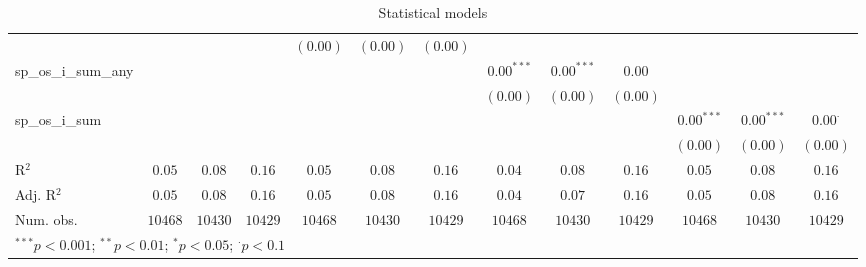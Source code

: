 \begin{sidewaystable}
\begin{center}
{\begin{tabular}{l c c c c c c c c c c c c}
                    &               &               &                 & $(0.00)$      & $(0.00)$      & $(0.00)$        &               &               &                 &                &               &                 \\
sp\_os\_i\_sum\_any &               &               &                 &               &               &                 & $0.00^{***}$  & $0.00^{***}$  & $0.00$          &                &               &                 \\
                    &               &               &                 &               &               &                 & $(0.00)$      & $(0.00)$      & $(0.00)$        &                &               &                 \\
sp\_os\_i\_sum      &               &               &                 &               &               &                 &               &               &                 & $0.00^{***}$   & $0.00^{***}$  & $0.00^{\cdot}$  \\
                    &               &               &                 &               &               &                 &               &               &                 & $(0.00)$       & $(0.00)$      & $(0.00)$        \\
\hline
R$^2$               & $0.05$        & $0.08$        & $0.16$          & $0.05$        & $0.08$        & $0.16$          & $0.04$        & $0.08$        & $0.16$          & $0.05$         & $0.08$        & $0.16$          \\
Adj. R$^2$          & $0.05$        & $0.08$        & $0.16$          & $0.05$        & $0.08$        & $0.16$          & $0.04$        & $0.07$        & $0.16$          & $0.05$         & $0.08$        & $0.16$          \\
Num. obs.           & $10468$       & $10430$       & $10429$         & $10468$       & $10430$       & $10429$         & $10468$       & $10430$       & $10429$         & $10468$        & $10430$       & $10429$         \\
\hline
\multicolumn{13}{l}{\scriptsize{$^{***}p<0.001$; $^{**}p<0.01$; $^{*}p<0.05$; $^{\cdot}p<0.1$}}
\end{tabular}
}
\caption{Statistical models}
\label{table:coefficients}
\end{center}
\end{sidewaystable}
